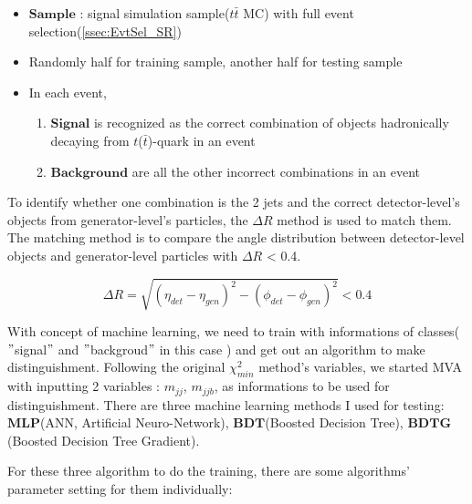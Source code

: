 			\begin{itemize}

				\item $\textbf{Sample}$ : signal simulation sample($t\bar{t}$ MC) with full event selection(\ref{ssec:EvtSel_SR})
				\item Randomly half for training sample, another half for testing sample
				\item In each event,
				\begin{enumerate}
					\item $\textbf{Signal}$ is recognized as the correct combination of objects hadronically decaying from $t$($\bar{t}$)-quark in an event
					\item $\textbf{Background}$ are all the other incorrect combinations in an event
				\end{enumerate}
			\end{itemize}

			To identify whether one combination is the 2 jets and the correct detector-level's objects from generator-level's particles, the $\Delta R$ method is used to match them. The matching method is to compare the angle distribution between detector-level objects and generator-level particles with $\Delta R$ < 0.4. 
			
			\begin{equation}
			\Delta R = \sqrt{ (\eta_{det} - \eta_{gen})^2 - (\phi_{det} - \phi_{gen})^2 } < 0.4
			\label{eq:gen_matching}
			\end{equation}
		
			With concept of machine learning, we need to train with informations of classes( $"$signal$"$ and $"$backgroud$"$ in this case ) and get out an algorithm to make distinguishment. Following the original $\chi^2_{min}$ method's variables, we started MVA with inputting 2 variables : $m_{jj}$, $m_{jjb}$, as informations to be used for distinguishment. There are three machine learning methods I used for testing: $\textbf{MLP}$(ANN, Artificial Neuro-Network), $\textbf{BDT}$(Boosted Decision Tree), $\textbf{BDTG}$(Boosted Decision Tree Gradient).

			For these three algorithm to do the training, there are some algorithms' parameter setting for them individually:

